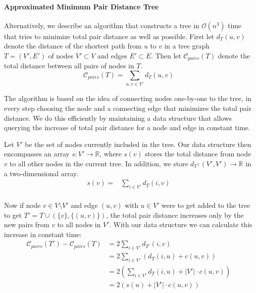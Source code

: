 \documentclass[a4paper, oneside]{discothesis}
\begin{document}
\paragraph{Approximated Minimum Pair Distance Tree}\label{tree:ampd}

Alternatively, we describe an algorithm that constructs a tree in $\mathcal{O}(n^3)$ time that tries to minimize total pair distance as well as possible. First let $d_T(u, v)$ denote the distance of the shortest path from $u$ to $v$ in a tree graph $T=(V',E')$ of nodes $V'\subset V$ and edges $E'\subset E$. Then let $\mathcal{C}_{pairs}(T)$ denote the total distance between all pairs of nodes in $T$.
\begin{equation}
\mathcal{C}_{pairs}(T) = \sum_{u,v\in V'}d_T(u,v)
\end{equation}

The algorithm is based on the idea of connecting nodes one-by-one to the tree, in every step choosing the node and a connecting edge that minimizes the total pair distance. We do this efficiently by maintaining a data structure that allows querying the increase of total pair distance for a node and edge in constant time.

Let $V'$ be the set of nodes currently included in the tree. Our data structure then encompasses an array $s:V'\to\mathbb{R}$, where $s(v)$ stores the total distance from node $v$ to all other nodes in the current tree. In addition, we store $d_T:(V',V')\to\mathbb{R}$ in a two-dimensional array.
\begin{equation}
\begin{split}
s(v)=&\sum_{i\in V'}d_T(i,v) \\
\end{split}
\end{equation}

Now if node $v\in V\setminus V'$ and edge $(u,v)$ with $u\in V'$ were to get added to the tree to get $T'=T\cup(\{v\}, \{(u,v)\})$, the total pair distance increases only by the new pairs from $v$ to all nodes in $V'$. With our data structure we can calculate this increase in constant time:
\begin{equation}
\begin{split}
\mathcal{C}_{pairs}(T')-\mathcal{C}_{pairs}(T)&=2\sum_{i\in V'}d_{T'}(i, v)\\
&=2\sum_{i\in V'}\left(d_T(i,u)+c(u,v)\right) \\
&=2\left(\sum_{i\in V'}d_T(i,u)+|V'|\cdot c(u,v)\right)\\
&=2\left(s(u)+|V'|\cdot c(u,v)\right) \\
\end{split}
\end{equation}
\end{document}
